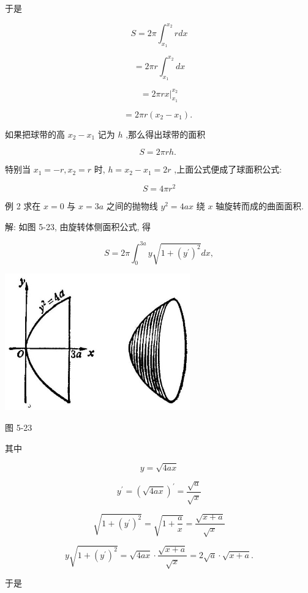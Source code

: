 \documentclass[10pt]{article}
\begin{document}
于是

\[
S = {2\pi }{\int }_{{x}_{1}}^{{x}_{2}}{rdx}
\]

\[
= {2\pi r}{\int }_{{x}_{1}}^{{x}_{2}}{dx}
\]

\[
= {\left. 2\pi rx\right| }_{{x}_{1}}^{{x}_{2}}
\]

\[
= {2\pi r}\left( {{x}_{2} - {x}_{1}}\right) \text{. }
\]

如果把球带的高 \({x}_{2} - {x}_{1}\) 记为 \(h\) ,那么得出球带的面积

\[
S = {2\pi rh}\text{. }
\]

特别当 \({x}_{1} = - r,{x}_{2} = r\) 时, \(h = {x}_{2} - {x}_{1} = {2r}\) ,上面公式便成了球面积公式:

\[
S = {4\pi }{r}^{2}
\]

例 2 求在 \(x = 0\) 与 \(x = {3a}\) 之间的抛物线 \({y}^{2} = {4ax}\) 绕 \(x\) 轴旋转而成的曲面面积.

解: 如图 5-23, 由旋转体侧面积公式, 得

\[
S = {2\pi }{\int }_{0}^{3a}y\sqrt{1 + {\left( {y}^{\prime }\right) }^{2}}{dx},
\]

\begin{center}
\includegraphics[max width=0.6\textwidth]{images/01912c18-5c3f-733d-b775-749ba9897a9d_247_426094.jpg}
\end{center}

图 5-23

其中

\[
y = \sqrt{4ax}
\]

\[
{y}^{\prime } = {\left( \sqrt{4ax}\right) }^{\prime } = \frac{\sqrt{a}}{\sqrt{x}}
\]

\[
\sqrt{1 + {\left( {y}^{\prime }\right) }^{2}} = \sqrt{1 + \frac{a}{x}} = \frac{\sqrt{x + a}}{\sqrt{x}}
\]

\[
y\sqrt{1 + {\left( {y}^{\prime }\right) }^{2}} = \sqrt{4ax} \cdot \frac{\sqrt{x + a}}{\sqrt{x}} = 2\sqrt{a} \cdot \sqrt{x + a}.
\]

于是
\end{document}
